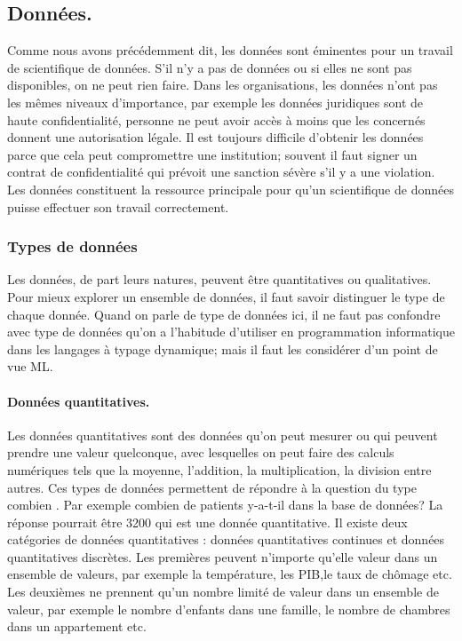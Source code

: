 \documentclass[12pt, french]{report}
\begin{document}
\subsection{Données.}

Comme nous avons précédemment dit, les données sont éminentes pour un travail de scientifique de données. S'il n'y a pas de données ou si elles ne sont pas disponibles, on ne peut rien faire. Dans les organisations, les données n'ont pas les mêmes niveaux d'importance, par exemple les données juridiques sont de haute confidentialité, personne ne peut avoir accès à moins que les concernés donnent une autorisation légale. Il est toujours difficile d'obtenir les données parce que cela peut compromettre une institution; souvent il faut signer un contrat de confidentialité qui prévoit une sanction sévère s'il y a une violation.  Les données constituent la ressource principale pour qu'un scientifique de données puisse effectuer son travail correctement. 

\subsubsection{Types de données} 
Les données, de part leurs natures, peuvent être quantitatives ou qualitatives. Pour mieux explorer un ensemble de données, il faut savoir distinguer le type de chaque donnée. Quand on parle de type de données ici, il ne faut pas confondre avec type de données qu'on a l'habitude d'utiliser en programmation informatique dans les langages à typage dynamique; mais il faut les considérer d'un point de vue ML. 

\paragraph{Données quantitatives.} Les données quantitatives sont des données qu'on peut mesurer ou qui peuvent prendre une valeur quelconque, avec lesquelles on peut faire des calculs numériques tels que la moyenne, l'addition, la multiplication, la division entre autres. Ces types de données permettent de répondre à la question du type \guillemotleft combien \guillemotright. Par exemple combien de patients y-a-t-il dans la base de données? La réponse pourrait être 3200 qui est une donnée quantitative. Il existe deux catégories de données quantitatives : données quantitatives continues et données quantitatives discrètes. Les premières peuvent n'importe qu'elle valeur dans un ensemble de valeurs, par exemple la température, les PIB,le taux de chômage etc. Les deuxièmes ne prennent qu'un nombre limité de valeur dans un ensemble de valeur, par exemple le nombre d'enfants dans une famille, le nombre de chambres dans un appartement etc. 
    
\end{document}
